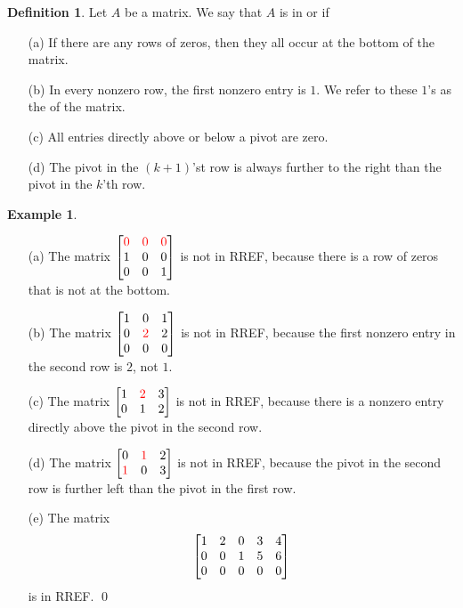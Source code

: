 \documentclass[a4paper]{book}
\theoremstyle{definition}
\newtheorem{definition}[theorem]{Definition}
\newtheorem{example}[theorem]{Example}
\begin{document}
\begin{definition}
 Let $A$ be a matrix.  We say that $A$ is in  or  if
 \begin{itemize}
  \item[(a)] If there are any rows of zeros, then they all occur at
   the bottom of the matrix.
  \item[(b)] In every nonzero row, the first nonzero entry is $1$.  We
   refer to these $1$'s as the  of the matrix.
  \item[(c)] All entries directly above or below a pivot are zero.
  \item[(d)] The pivot in the $(k+1)$'st row is always
   further to the right than the pivot in the $k$'th row.
 \end{itemize}
\end{definition}
\begin{example}
 \begin{itemize}
  \item[(a)] The matrix
   {\small $\begin{bmatrix} {\color{red}0}&{\color{red}0}&{\color{red}0} \\ 1&0&0 \\ 0&0&1\end{bmatrix}$}
   is not in RREF, because there is a row of zeros that is not at the
   bottom. 
  \item[(b)] The matrix
   {\small $\begin{bmatrix} 1&0&1 \\ 0&{\color{red}2}&2 \\ 0&0&0\end{bmatrix}$}
   is not in RREF, because the first nonzero entry in the second row
   is $2$, not $1$.
  \item[(c)] The matrix
   {\small $\begin{bmatrix} 1&{\color{red}2}&3 \\ 0&1&2 \end{bmatrix}$}
   is not in RREF, because there is a nonzero entry directly above the
   pivot in the second row.
  \item[(d)] The matrix
   {\small $\begin{bmatrix} 0&{\color{red}1}&2 \\ {\color{red}1}&0&3 \end{bmatrix}$}
   is not in RREF, because the pivot in the second row is further left
   than the pivot in the first row.
  \item[(e)] The matrix
   {\small \[ \begin{bmatrix} 1&2&0&3&4 \\ 0&0&1&5&6 \\ 0&0&0&0&0 \end{bmatrix} \]}
   is in RREF. \qed
 \end{itemize}
\end{example}
\end{document}
